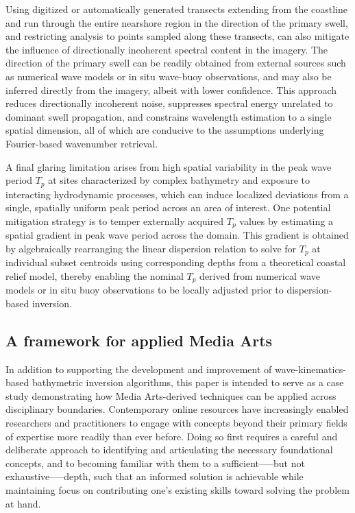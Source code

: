 \documentclass[12pt]{article}
\begin{document}
Using digitized or automatically generated transects extending from the coastline and run through the entire nearshore region in the direction of the primary swell, and restricting analysis to points sampled along these transects, can also mitigate the influence of directionally incoherent spectral content in the imagery. The direction of the primary swell can be readily obtained from external sources such as numerical wave models or in situ wave-buoy observations, and may also be inferred directly from the imagery, albeit with lower confidence. This approach reduces directionally incoherent noise, suppresses spectral energy unrelated to dominant swell propagation, and constrains wavelength estimation to a single spatial dimension, all of which are conducive to the assumptions underlying Fourier-based wavenumber retrieval.

A final glaring limitation arises from high spatial variability in the peak wave period $T_p$ at sites characterized by complex bathymetry and exposure to interacting hydrodynamic processes, which can induce localized deviations from a single, spatially uniform peak period across an area of interest. One potential mitigation strategy is to temper externally acquired $T_p$ values by estimating a spatial gradient in peak wave period across the domain. This gradient is obtained by algebraically rearranging the linear dispersion relation to solve for $T_p$ at individual subset centroids using corresponding depths from a theoretical coastal relief model, thereby enabling the nominal $T_p$ derived from numerical wave models or in situ buoy observations to be locally adjusted prior to dispersion-based inversion.~\cite{Mudiyanselage2024}

\subsection{A framework for applied Media Arts}

In addition to supporting the development and improvement of wave-kinematics-based bathymetric inversion algorithms, this paper is intended to serve as a case study demonstrating how Media Arts-derived techniques can be applied across disciplinary boundaries. Contemporary online resources have increasingly enabled researchers and practitioners to engage with concepts beyond their primary fields of expertise more readily than ever before. Doing so first requires a careful and deliberate approach to identifying and articulating the necessary foundational concepts, and to becoming familiar with them to a sufficient--—but not exhaustive—--depth, such that an informed solution is achievable while maintaining focus on contributing one's existing skills toward solving the problem at hand.
\end{document}
